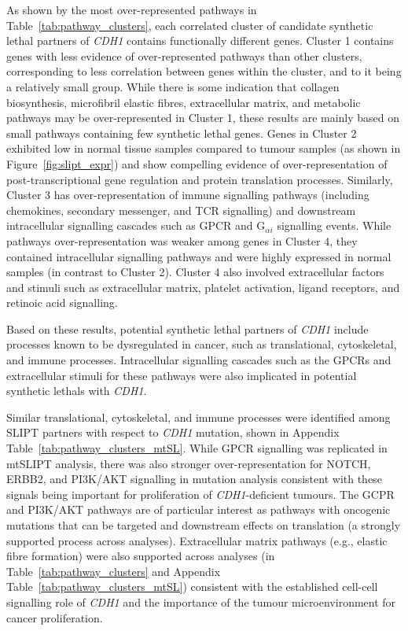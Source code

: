 As shown by the most over-represented \glspl{pathway} in Table~\ref{tab:pathway_clusters}, each correlated cluster of candidate \gls{synthetic lethal} partners of \textit{CDH1} contains functionally different genes. %
Cluster 1 contains genes with less evidence of over-represented \glspl{pathway} than other clusters, corresponding to less correlation between genes within the cluster, and to it being a relatively small group. While there is some indication that collagen biosynthesis, microfibril elastic fibres, extracellular matrix, and metabolic \glspl{pathway} may be over-represent\-ed in Cluster 1, these results are mainly based on small \glspl{pathway} containing few \gls{synthetic lethal} genes. Genes in Cluster 2 exhibited low  in normal tissue samples compared to tumour samples (as shown in Figure~\ref{fig:slipt_expr}) and show compelling evidence of over-represent\-ation of post-transcriptional gene regulation and protein translation processes. Similarly, Cluster 3 has over-represent\-ation of immune signalling \glspl{pathway} (including chemokines, secondary messenger, and TCR signalling) and downstream intracellular signalling cascades such as \gls{GPCR} and  G$_{\alpha i}$ signalling events. While \glspl{pathway} over-represent\-ation was weaker among genes in Cluster 4, they contained intracellular signalling \glspl{pathway} and were highly expressed in normal samples (in contrast to Cluster 2). Cluster 4 also involved extracellular factors and stimuli such as extracellular matrix, platelet activation, ligand receptors, and retinoic acid signalling.

Based on these results, potential \gls{synthetic lethal} partners of \textit{CDH1} include processes known to be dysregulated in cancer, such as translational, cytoskeletal, and immune processes. Intracellular signalling cascades such as the \glspl{GPCR} and extracellular stimuli for these \glspl{pathway} were also implicated in potential \glspl{synthetic lethal} with \textit{CDH1}.

Similar translational, cytoskeletal, and immune processes were identified among \gls{SLIPT} partners with respect to \textit{CDH1} \gls{mutation}, shown in Appendix Table~\ref{tab:pathway_clusters_mtSL}. While \gls{GPCR} signalling was replicated in \acrshort{mtSLIPT} analysis, there was also stronger over-representation for NOTCH, ERBB2, and PI3K/AKT signalling in \gls{mutation} analysis consistent with these signals being important for proliferation of \textit{CDH1}-deficient tumours. The GCPR and PI3K/AKT \glspl{pathway} are of particular interest as \glspl{pathway} with oncogenic \glspl{mutation} that can be targeted and downstream effects on translation (a strongly supported process across analyses). Extracellular matrix \glspl{pathway} (e.g., elastic fibre formation) were also supported across analyses (in Table~\ref{tab:pathway_clusters} and Appendix Table~\ref{tab:pathway_clusters_mtSL}) consistent with the established cell-cell signalling role of \textit{CDH1} and the importance of the tumour microenvironment for cancer proliferation.

